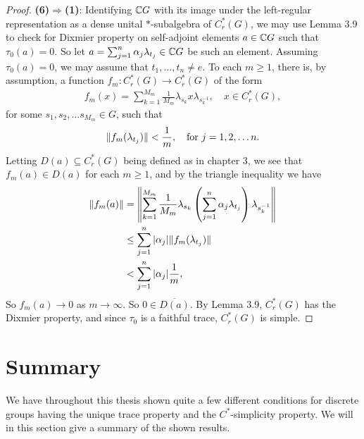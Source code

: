 \begin{theorem}
\begin{proof}
\textbf{(6)$\Rightarrow$(1)}:
Identifying $\mathbb{C} G$ with its image under the left-regular representation as a dense unital $*$-subalgebra of $C_r^*(G)$, we may use Lemma 3.9 to check for Dixmier property on self-adjoint elements $a \in \mathbb{C} G$ such that $\tau_0 (a) = 0$. So let $a=\sum_{j=1}^n \alpha_j \lambda_{t_j} \in \mathbb{C} G$ be such an element. Assuming $\tau_0 (a) = 0$, we may assume that $t_1,\dots,t_n \neq e$. To each $m \geq 1$, there is, by assumption, a function $f_m \colon C_r^*(G) \to C_r^*(G)$ of the form
\begin{align*}
f_m(x)=\sum_{k=1}^{M_m} \frac{1}{M_m} \lambda_{s_k} x \lambda_{s_k^{-1}}, \quad x \in C_r^*(G),
\end{align*}
for some  $s_1,s_2,\dots s_{M_m} \in G$, such that 
\begin{align*}
\lVert f_m (\lambda_{t_j}) \rVert < \frac{1}{m}, \quad \text{for } j =1,2,\dots n.
\end{align*}
Letting $D(a)\subseteq C_r^*(G)$ being defined as in chapter 3, we see that $f_m(a) \in D(a)$ for each $m \geq 1$, and by the triangle inequality we have
\begin{align*}
\lVert f_m (a) \rVert &= \left\lVert \sum_{k=1}^{M_m} \frac{1}{M_m} \lambda_{s_k} \left(\sum_{j=1}^n \alpha_j \lambda_{t_j} \right)\lambda_{s_k^{-1}}\right\rVert\\
&\leq \sum_{j=1}^n |\alpha_j| \lVert f_m(\lambda_{t_j})\rVert\\
&< \sum_{j=1}^n |\alpha_j| \frac{1}{m},
\end{align*}
So $f_m(a) \to 0$ as $m \to \infty$. So $0 \in \overline{D(a)}$. By Lemma 3.9, $C_r^* (G)$ has the Dixmier property, and since $\tau_0$ is a faithful trace, $C_r^*(G)$ is simple.
\end{proof}
\end{theorem}

\section{Summary}
We have throughout this thesis shown quite a few different conditions for discrete groups having the unique trace property and the $C^*$-simplicity property. We will in this section give a summary of the shown results.

